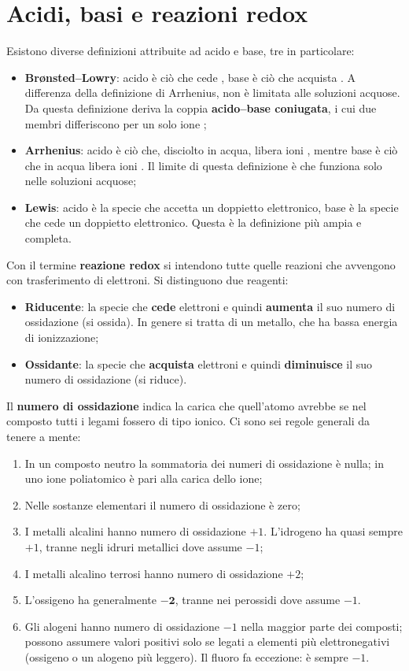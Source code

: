 \documentclass[11pt, a4paper, openright]{book}
\begin{document}
\section{Acidi, basi e reazioni redox}
Esistono diverse definizioni attribuite ad acido e base, tre in particolare:
\begin{itemize}
    \item \textbf{Brønsted--Lowry}: acido è ciò che cede , base è ciò che acquista . A differenza della definizione di Arrhenius, non è limitata alle soluzioni acquose. Da questa definizione deriva la coppia \textbf{acido--base coniugata}, i cui due membri differiscono per un solo ione ;
    \item \textbf{Arrhenius}: acido è ciò che, disciolto in acqua, libera ioni , mentre base è ciò che in acqua libera ioni . Il limite di questa definizione è che funziona solo nelle soluzioni acquose;
    \item \textbf{Lewis}: acido è la specie che accetta un doppietto elettronico, base è la specie che cede un doppietto elettronico. Questa è la definizione più ampia e completa.
\end{itemize}
Con il termine \textbf{reazione redox} si intendono tutte quelle reazioni che avvengono con trasferimento di elettroni. Si distinguono due reagenti:
\begin{itemize}
    \item \textbf{Riducente}: la specie che \textbf{cede} elettroni e quindi \textbf{aumenta} il suo numero di ossidazione (si ossida). In genere si tratta di un metallo, che ha bassa energia di ionizzazione;
    \item \textbf{Ossidante}: la specie che \textbf{acquista} elettroni e quindi \textbf{diminuisce} il suo numero di ossidazione (si riduce).
\end{itemize}
Il \textbf{numero di ossidazione} indica la carica che quell'atomo avrebbe se nel composto tutti i legami fossero di tipo ionico. Ci sono sei regole generali da tenere a mente:
\begin{enumerate}
    \item In un composto neutro la sommatoria dei numeri di ossidazione è nulla; in uno ione poliatomico è pari alla carica dello ione;
    \item Nelle sostanze elementari il numero di ossidazione è zero;
    \item I metalli alcalini hanno numero di ossidazione $+1$. L'idrogeno ha quasi sempre $+1$, tranne negli idruri metallici dove assume $-1$;
    \item I metalli alcalino terrosi hanno numero di ossidazione $+2$;
    \item L'ossigeno ha generalmente $\mathbf{-2}$, tranne nei perossidi dove assume $-1$.
    \item Gli alogeni hanno numero di ossidazione $-1$ nella maggior parte dei composti; possono assumere valori positivi solo se legati a elementi più elettronegativi (ossigeno o un alogeno più leggero). Il fluoro fa eccezione: è sempre $-1$.
\end{enumerate}
\newpage
\end{document}
